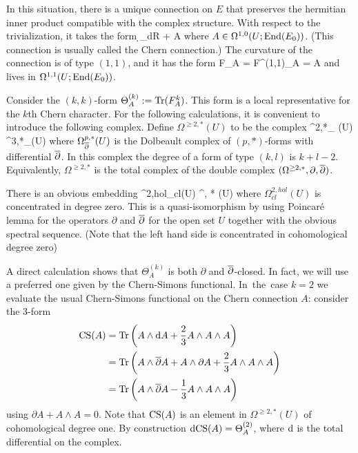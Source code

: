 
In this situation, there is a unique connection on $E$ 
that preserves the hermitian inner product compatible with the complex structure. 
With respect to the trivialization, it takes the form
\ben
\d_{dR} + A 
\een
where $A \in \Omega^{1,0}(U ; {\rm End}(E_0))$. 
(This connection is usually called the Chern connection.)  
The curvature of the connection is of type $(1,1)$, and it has the form
\ben
F_A = F^{(1,1)}_A = \dbar A 
\een
and lives in $\Omega^{1,1}(U ; {\rm End}(E_0))$.

Consider the $(k,k)$-form $\Theta^{(k)}_A := {\rm Tr} (F_A^k)$. 
This form is a local representative for the $k$th Chern character. 
For the following calculations, it is convenient to introduce the following complex. 
Define $\Omega^{\geq 2, *} (U)$ to be the complex
\ben
\Omega^{2,*}_{\dbar} (U) \xto{\partial} \Omega^{3,*}_{\dbar}(U) \xto{\partial} \cdots
\een
where $\Omega^{p,*}_{\overline{\partial}} (U)$ is the Dolbeault complex of
$(p,*)$-forms with differential $\overline{\partial}$. In this complex the degree of a form of type
$(k,l)$ is $k+l - 2$. Equivalently, $\Omega^{\geq 2, *}$ is the total complex of the
double complex $(\Omega^{\geq 2, *}, \partial, \overline{\partial})$. 

There is an obvious embedding
\ben
\Omega^{2,hol}_{cl}(U) \hookrightarrow \Omega^{, *} (U)
\een 
where $\Omega^{2,hol}_{cl}(U)$ is concentrated in degree zero. This is a quasi-isomorphism by using Poincar\'e lemma for the operators
$\partial$ and $\overline{\partial}$ for the open set
$U$ together with the obvious spectral sequence. (Note that the left hand side is concentrated in cohomological
degree zero)

A direct calculation shows that $\Theta^{(k)}_A$ is both $\partial$ and
$\overline{\partial}$-closed. 
In fact, we will use a
preferred one given by the Chern-Simons functional. 
\si
In the case $k = 2$ we evaluate the usual Chern-Simons functional on the Chern connection $A$: consider the $3$-form
\begin{align*}
{\rm CS} (A) & = {\rm Tr}\left(A \wedge {\rm d} A + \frac{2}{3} A \wedge A \wedge A \right) \\ & = {\rm Tr}\left(A \wedge \overline{\partial} A + A \wedge \partial A + \frac{2}{3} A \wedge A \wedge A \right) \\
& = {\rm Tr}\left(A \wedge \overline{\partial} A - \frac{1}{3} A\wedge A \wedge A\right)
\end{align*}
using $\partial A + A \wedge A = 0$. 
Note that ${\rm CS} (A)$ is an element in $\Omega^{\geq 2, *} (U)$ of cohomological degree one. 
By construction ${\rm d}{\rm CS}(A) =\Theta^{(2)}_A$, 
where ${\rm d}$ is the total differential on the complex. 

